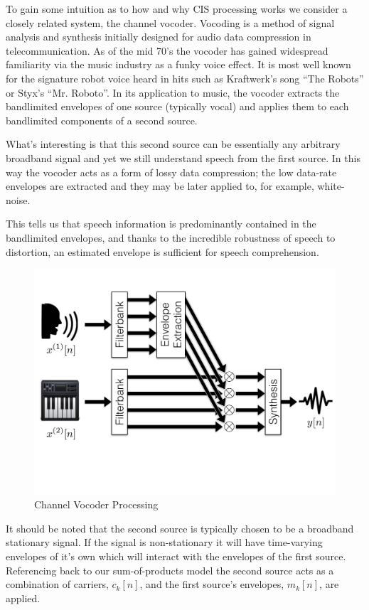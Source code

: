 \documentclass [11pt, proquest,oneside] {ganter_thesis}[2015/03/03]
\begin{document}
To gain some intuition as to how and why CIS processing works we consider a closely related system, the channel vocoder.  Vocoding is a method of signal analysis and synthesis initially designed for audio data compression in telecommunication.  As of the mid 70's the vocoder has gained widespread familiarity via the music industry as a funky voice effect.  It is most well known for the signature robot voice heard in hits such as Kraftwerk's song ``The Robots'' or Styx's ``Mr. Roboto''.  In its application to music, the vocoder extracts the bandlimited envelopes of one source (typically vocal) and applies them to each bandlimited components of a second source.

What's interesting is that this second source can be essentially any arbitrary broadband signal and yet we still understand speech from the first source.  In this way the vocoder acts as a form of lossy data compression; the low data-rate envelopes are extracted and they may be later applied to, for example, white-noise.

This tells us that speech information is predominantly contained in the bandlimited envelopes, and thanks to the incredible robustness of speech to distortion, an estimated envelope is sufficient for speech comprehension.

\begin{figure}[!ht]
  \centering
    \includegraphics[width=.75\textwidth]{vocoder}   
    \caption{Channel Vocoder Processing}\label{fig:vocoder}
\end{figure}

It should be noted that the second source is typically chosen to be a broadband stationary signal.  If the signal is non-stationary it will have time-varying envelopes of it's own which will interact with the envelopes of the first source. Referencing back to our sum-of-products model the second source acts as a combination of carriers, $c_k[n]$, and the first source's envelopes, $m_k[n]$, are applied.
\end{document}
